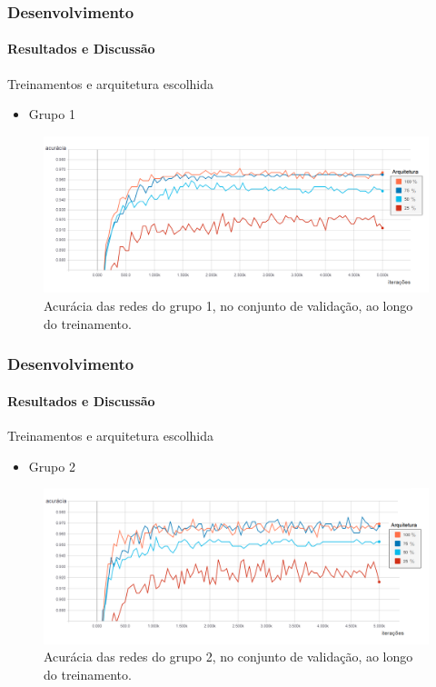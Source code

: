 \documentclass{beamer}
\begin{document}
    
    \begin{frame}[t]
      \frametitle{Desenvolvimento}
      \framesubtitle{Resultados e Discussão}  \medskip  
      	Treinamentos e arquitetura escolhida \medskip    
      	\begin{itemize}
      		\item Grupo 1
		\end{itemize}      	  	
		\begin{figure}[t]
      		 \begin{minipage}[h]{1.0\linewidth}
         		\centering
      			\includegraphics[height=0.42\linewidth]{img/acc_1_5000.png}
      			\caption{Acurácia das redes do grupo 1, no conjunto de validação, ao longo do treinamento.}
      		\end{minipage}
      		\vspace{0.00mm}
      	\end{figure}	      	       
    \end{frame}
    
    \begin{frame}[t]
      \frametitle{Desenvolvimento}
      \framesubtitle{Resultados e Discussão} \medskip       
      	Treinamentos e arquitetura escolhida \medskip    
      	\begin{itemize}
      		\item Grupo 2
		\end{itemize}      	  	
		\begin{figure}[t]
      		 \begin{minipage}[h]{1.0\linewidth}
         		\centering
      			\includegraphics[height=0.42\linewidth]{img/acc_2_5000.png}
      			\caption{Acurácia das redes do grupo 2, no conjunto de validação, ao longo do treinamento.}
      		\end{minipage}
      		\vspace{0.00mm}
      	\end{figure}	      	       
    \end{frame}
    
\end{document}
